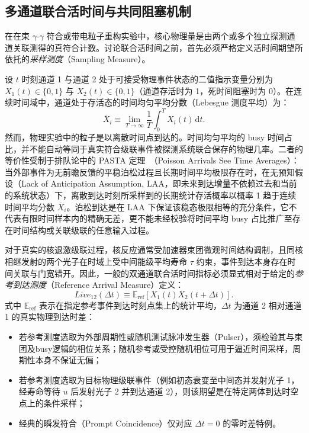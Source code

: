 \subsection{多通道联合活时间与共同阻塞机制}\label{subsec:5-5-4}

在在束 $\gamma\text{-}\gamma$ 符合或带电粒子重构实验中，核心物理量是由两个或多个独立探测通道关联测得的真符合计数。讨论联合活时间之前，首先必须严格定义活时间期望所依托的\emph{采样测度}（Sampling Measure）。

设 $t$ 时刻通道 1 与通道 2 处于可接受物理事件状态的二值指示变量分别为 $X_1(t) \in \{0, 1\}$ 与 $X_2(t) \in \{0, 1\}$（通道存活时为 1，死时间阻塞时为 0）。在连续时间域中，通道处于存活态的时间均匀平均分数（Lebesgue 测度平均）为：
\begin{equation}\label{eq:5-5-time-avg-live}
\overline{X}_i \equiv \lim_{T \to \infty} \frac{1}{T} \int_0^T X_i(t) \, \mathrm{d}t.
\end{equation}
然而，物理实验中的粒子是以离散时间点到达的。时间均匀平均的 busy 时间占比，并不能自动等同于真实符合级联事件被探测系统联合保存的物理几率。二者的等价性受制于排队论中的 PASTA 定理~\cite{wolff-1982-poisson-arrivals-see-time-averages}（Poisson Arrivals See Time Averages）：当外部事件为无前瞻反馈的平稳泊松过程且长期时间平均极限存在时，在无预知假设（Lack of Anticipation Assumption, LAA，即未来到达增量不依赖过去和当前的系统状态）下，离散到达时刻所采样到的长期统计存活概率以概率 1 趋于连续时间平均分数 $\overline{X}_i$。泊松到达是在 LAA 下保证该稳态极限相等的充分条件，它不代表有限时间样本内的精确无差，更不能未经校验将时间平均 busy 占比推广至存在时间结构或关联级联的任意输入过程。

对于真实的核退激级联过程，核反应通常受加速器束团微观时间结构调制，且同核相继发射的两个光子在时域上受中间能级平均寿命 $\tau$ 约束，事件到达本身存在时间关联与门宽错开。因此，一般的双通道联合活时间指标必须显式相对于给定的\emph{参考到达测度}（Reference Arrival Measure）定义：
\begin{equation}\label{eq:5-5-joint-live-ref}
Live_{12}(\Delta t) \equiv \mathbb{E}_{\mathrm{ref}}[X_1(t) X_2(t + \Delta t)].
\end{equation}
式中 $\mathbb{E}_{\mathrm{ref}}$ 表示在指定参考事件到达时刻点集上的统计平均，$\Delta t$ 为通道 2 相对通道 1 的真实物理到达时差：
\begin{itemize}
\item 若参考测度选取为外部周期性或随机测试脉冲发生器（Pulser），须检验其与束团及busy逻辑的相位关系；随机参考或受控随机相位可用于逼近时间采样，周期性本身不保证无偏；
\item 若参考测度选取为目标物理级联事件（例如初态衰变至中间态并发射光子 1，经寿命等待 $u$ 后发射光子 2 并到达通道 2），则该期望是在特定两体到达时空点上的条件采样；
\item 经典的瞬发符合（Prompt Coincidence）仅对应 $\Delta t = 0$ 的零时差特例。
\end{itemize}

